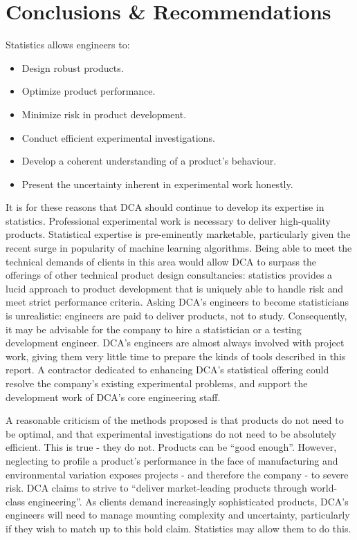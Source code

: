 \documentclass[11pt,a4paper,article]{memoir} %
\begin{document}
\chapter{Conclusions \& Recommendations}
\vspace{-28pt}
Statistics allows engineers to:
\begin{itemize}
\item Design robust products.
\item Optimize product performance.
\item Minimize risk in product development.
\item Conduct efficient experimental investigations.
\item Develop a coherent understanding of a product's behaviour.
\item Present the uncertainty inherent in experimental work honestly.
\end{itemize}
It is for these reasons that DCA should continue to develop its expertise in statistics. Professional experimental work is necessary to deliver high-quality products. Statistical expertise is pre-eminently marketable, particularly given the recent surge in popularity of machine learning algorithms. Being able to meet the technical demands of clients in this area would allow DCA to surpass the offerings of other technical product design consultancies: statistics provides a lucid approach to product development that is uniquely able to handle risk and meet strict performance criteria. Asking DCA's engineers to become statisticians is unrealistic: engineers are paid to deliver products, not to study. Consequently, it may be advisable for the company to hire a statistician or a testing development engineer. DCA's engineers are almost always involved with project work, giving them very little time to prepare the kinds of tools described in this report. A contractor dedicated to enhancing DCA's statistical offering could resolve the company's existing experimental problems, and support the development work of DCA's core engineering staff.

A reasonable criticism of the methods proposed is that products do not need to be optimal, and that experimental investigations do not need to be absolutely efficient. This is true - they do not. Products can be ``good enough''. However, neglecting to profile a product's performance in the face of manufacturing and environmental variation exposes projects - and therefore the company - to severe risk. DCA claims to strive to ``deliver market-leading products through world-class engineering''. As clients demand increasingly sophisticated products, DCA's engineers will need to manage mounting complexity and uncertainty, particularly if they wish to match up to this bold claim. Statistics may allow them to do this.


\newpage


\end{document}
